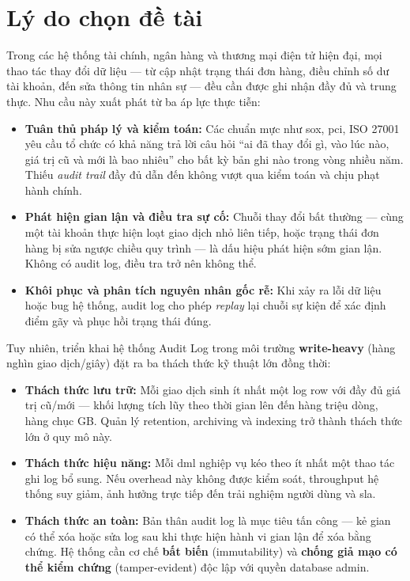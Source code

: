 \section{Lý do chọn đề tài}

Trong các hệ thống tài chính, ngân hàng và thương mại điện tử hiện đại, mọi thao tác thay đổi dữ liệu --- từ cập nhật trạng thái đơn hàng, điều chỉnh số dư tài khoản, đến sửa thông tin nhân sự --- đều cần được ghi nhận đầy đủ và trung thực. Nhu cầu này xuất phát từ ba áp lực thực tiễn:

\begin{itemize}
    \item \textbf{Tuân thủ pháp lý và kiểm toán:} Các chuẩn mực như \ac{sox}, \ac{pci}, ISO 27001 yêu cầu tổ chức có khả năng trả lời câu hỏi ``ai đã thay đổi gì, vào lúc nào, giá trị cũ và mới là bao nhiêu'' cho bất kỳ bản ghi nào trong vòng nhiều năm. Thiếu \textit{audit trail} đầy đủ dẫn đến không vượt qua kiểm toán và chịu phạt hành chính.
    \item \textbf{Phát hiện gian lận và điều tra sự cố:} Chuỗi thay đổi bất thường --- cùng một tài khoản thực hiện loạt giao dịch nhỏ liên tiếp, hoặc trạng thái đơn hàng bị sửa ngược chiều quy trình --- là dấu hiệu phát hiện sớm gian lận. Không có audit log, điều tra trở nên không thể.
    \item \textbf{Khôi phục và phân tích nguyên nhân gốc rễ:} Khi xảy ra lỗi dữ liệu hoặc bug hệ thống, audit log cho phép \textit{replay} lại chuỗi sự kiện để xác định điểm gãy và phục hồi trạng thái đúng.
\end{itemize}

Tuy nhiên, triển khai hệ thống Audit Log trong môi trường \textbf{write-heavy} (hàng nghìn giao dịch/giây) đặt ra ba thách thức kỹ thuật lớn đồng thời:

\begin{itemize}
    \item \textbf{Thách thức lưu trữ:} Mỗi giao dịch sinh ít nhất một log row với đầy đủ giá trị cũ/mới --- khối lượng tích lũy theo thời gian lên đến hàng triệu dòng, hàng chục GB. Quản lý retention, archiving và indexing trở thành thách thức lớn ở quy mô này.
    \item \textbf{Thách thức hiệu năng:} Mỗi \ac{dml} nghiệp vụ kéo theo ít nhất một thao tác ghi log bổ sung. Nếu overhead này không được kiểm soát, throughput hệ thống suy giảm, ảnh hưởng trực tiếp đến trải nghiệm người dùng và \ac{sla}.
    \item \textbf{Thách thức an toàn:} Bản thân audit log là mục tiêu tấn công --- kẻ gian có thể xóa hoặc sửa log sau khi thực hiện hành vi gian lận để xóa bằng chứng. Hệ thống cần cơ chế \textbf{bất biến} (immutability) và \textbf{chống giả mạo có thể kiểm chứng} (tamper-evident) độc lập với quyền database admin.
\end{itemize}

